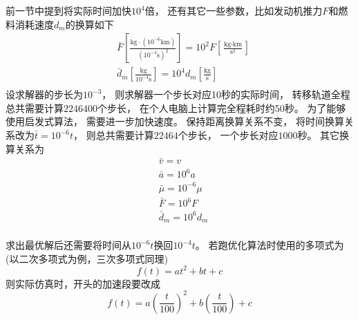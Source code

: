前一节中提到将实际时间加快$10^4$倍，
还有其它一些参数，比如发动机推力$F$和燃料消耗速度$d_m$的换算如下
\begin{align*}
    &\bar{F}\left[\frac{\text{kg}\cdot(10^{-6}\text{km})}{(10^{-4}\text{s})^2}\right]
     = 10^2F\left[\frac{\text{kg}\cdot\text{km}}{\text{s}^2}\right] \\
    &\bar{d}_m\left[\frac{\text{kg}}{10^{-4}\text{s}}\right]
     = 10^4d_m\left[\frac{\text{kg}}{\text{s}}\right] \\
\end{align*}
设求解器的步长为$10^{-3}$，
则求解器一个步长对应10秒的实际时间，
转移轨道全程总共需要计算$2246400$个步长，
在个人电脑上计算完全程耗时约50秒。
为了能够使用启发式算法，
需要进一步加快速度。
保持距离换算关系不变，
将时间换算关系改为$\bar{t}=10^{-6}t$，
则总共需要计算$22464$个步长，
一个步长对应$1000$秒。
其它换算关系为
\begin{align*}
    &\bar{v} = v \\
    &\bar{a} = 10^6a \\
    &\bar{\mu} = 10^{-6}\mu \\
    &\bar{F} = 10^6F \\
    &\bar{d}_m = 10^6d_m \\
\end{align*}

求出最优解后还需要将时间从$10^{-6}t$换回$10^{-4}t$。
若跑优化算法时使用的多项式为(以二次多项式为例，三次多项式同理)
\[f(t)=at^2+bt+c\]
则实际仿真时，开头的加速段要改成
\[f(t)=a\left(\frac{t}{100}\right)^2+b\left(\frac{t}{100}\right)+c\]

